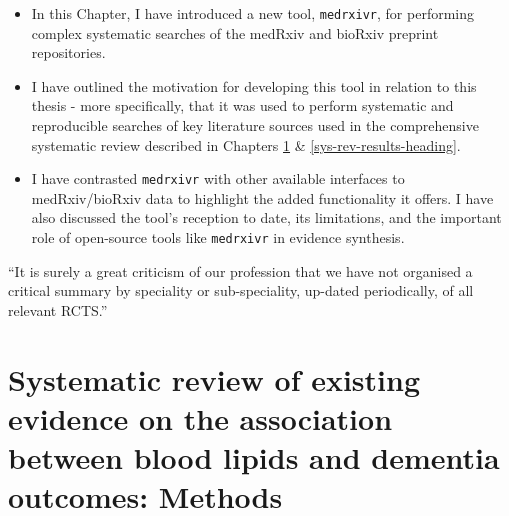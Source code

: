 \documentclass[a4paper, twoside]{templates/ociamthesis}
\begin{document}
\begin{itemize}
\item
  In this Chapter, I have introduced a new tool, \texttt{medrxivr}, for performing complex systematic searches of the medRxiv and bioRxiv preprint repositories.
\item
  I have outlined the motivation for developing this tool in relation to this thesis - more specifically, that it was used to perform systematic and reproducible searches of key literature sources used in the comprehensive systematic review described in Chapters \ref{sys-rev-methods-heading} \& \ref{sys-rev-results-heading}.
\item
  I have contrasted \texttt{medrxivr} with other available interfaces to medRxiv/bioRxiv data to highlight the added functionality it offers. I have also discussed the tool's reception to date, its limitations, and the important role of open-source tools like \texttt{medrxivr} in evidence synthesis.
\end{itemize}

\begin{savequote}
``It is surely a great criticism of our profession that we have not
organised a critical summary by speciality or sub-speciality, up-dated
periodically, of all relevant RCTS.''
\end{savequote}



\hypertarget{sys-rev-methods-heading}{%
\chapter{Systematic review of existing evidence on the association between blood lipids and dementia outcomes: Methods}\label{sys-rev-methods-heading}}

~

\minitoc 
\end{document}
